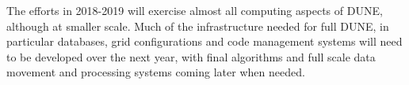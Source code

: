 The  efforts in 2018-2019 will exercise almost all computing aspects of DUNE, although at smaller scale.  Much of the infrastructure needed for full DUNE, in particular  databases, grid configurations and code management systems will need to be developed over the next year, with final algorithms and full scale data movement and processing systems coming later when needed. 


%
%
%
%
